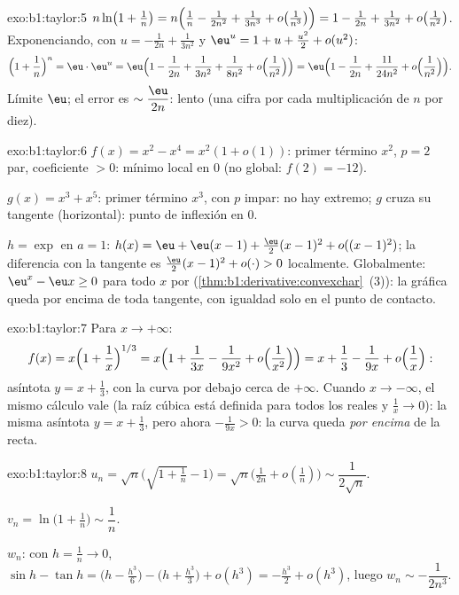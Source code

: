 \begin{solution}{exo:b1:taylor:5}
$n\ln\bigl(1 + \frac1n\bigr) = n\Bigl(\frac1n - \frac{1}{2n^2} +
\frac{1}{3n^3} + o\bigl(\frac{1}{n^3}\bigr)\Bigr) = 1 - \frac{1}{2n}
+ \frac{1}{3n^2} + o\bigl(\frac{1}{n^2}\bigr)$. Exponenciando, con
$u = -\frac{1}{2n} + \frac{1}{3n^2}$ y $\eu^u = 1 + u + \frac{u^2}2
+ o(u^2)$:
\[
\Bigl(1 + \frac1n\Bigr)^n = \eu\cdot \eu^{u}
= \eu\Bigl(1 - \frac{1}{2n} + \frac{1}{3n^2} + \frac{1}{8n^2}
+ o\Bigl(\frac{1}{n^2}\Bigr)\Bigr)
= \eu\Bigl(1 - \frac{1}{2n} + \frac{11}{24n^2} +
o\Bigl(\frac{1}{n^2}\Bigr)\Bigr).
\]
Límite $\eu$; el error es $\sim \dfrac{\eu}{2n}$: lento (una cifra
por cada multiplicación de $n$ por diez).
\end{solution}

\begin{solution}{exo:b1:taylor:6}
$f(x) = x^2 - x^4 = x^2(1 + o(1))$: primer término $x^2$, $p = 2$
par, coeficiente $> 0$: mínimo local en $0$ (no global: $f(2) = -12$).

$g(x) = x^3 + x^5$: primer término $x^3$, con $p$ impar: no hay
extremo; $g$ cruza su tangente (horizontal): punto de inflexión en $0$.

$h = \exp$ en $a = 1$:
$h(x) = \eu + \eu(x-1) + \frac{\eu}{2}(x-1)^2 + o((x-1)^2)$; la
diferencia con la tangente es $\frac{\eu}{2}(x-1)^2 + o(\cdot) > 0$
localmente. Globalmente: $\eu^x - \eu x \geq 0$ para todo $x$ por
 (\cref{thm:b1:derivative:convexchar}~(3)): la gráfica
queda por encima de toda tangente, con igualdad solo en el punto de
contacto.
\end{solution}

\begin{solution}{exo:b1:taylor:7}
Para $x \to +\infty$:
\[
f(x) = x\Bigl(1 + \frac1x\Bigr)^{1/3}
= x\Bigl(1 + \frac{1}{3x} - \frac{1}{9x^2} +
o\Bigl(\frac{1}{x^2}\Bigr)\Bigr)
= x + \frac13 - \frac{1}{9x} + o\Bigl(\frac1x\Bigr):
\]
asíntota $y = x + \frac13$, con la curva por debajo cerca de
$+\infty$. Cuando $x \to -\infty$, el mismo cálculo vale (la raíz
cúbica está definida para todos los reales y $\frac1x \to 0$): la
misma asíntota $y = x + \frac13$, pero ahora $-\frac{1}{9x} > 0$: la
curva queda \emph{por encima} de la recta.
\end{solution}

\begin{solution}{exo:b1:taylor:8}
$u_n = \sqrt n\bigl(\sqrt{1 + \tfrac1n} - 1\bigr) = \sqrt
n\bigl(\frac{1}{2n} + o(\frac1n)\bigr) \sim \dfrac{1}{2\sqrt n}$.

$v_n = \ln\bigl(1 + \frac1n\bigr) \sim \dfrac 1n$.

$w_n$: con $h = \frac1n \to 0$, $\sin h - \tan h = \bigl(h -
\frac{h^3}{6}\bigr) - \bigl(h + \frac{h^3}{3}\bigr) + o(h^3) =
-\frac{h^3}{2} + o(h^3)$, luego $w_n \sim -\dfrac{1}{2n^3}$.
\end{solution}

